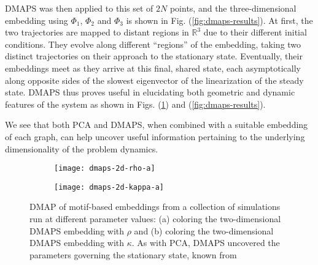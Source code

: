   DMAPS was then applied to this set of $2N$ points, and the
  three-dimensional embedding using $\Phi_1$, $\Phi_2$ and $\Phi_3$ is
  shown in Fig. (\ref{fig:dmaps-results}).
  At first, the two trajectories are mapped to distant regions in
  $\mathbb{R}^3$ due to their different initial conditions.
  They evolve along different ``regions'' of the embedding, taking two
  distinct trajectories on their approach to the stationary state.
  Eventually, their embeddings meet as they arrive at this final,
  shared state, each asymptotically along opposite sides of the
  slowest eigenvector of the linearization of the steady state.
  DMAPS thus proves useful in elucidating both geometric and dynamic
  features of the system as shown in Figs. (\ref{fig:dmaps-rk}) and (\ref{fig:dmaps-results}).

  We see that both PCA and DMAPS, when combined with a suitable
  embedding of each graph, can help uncover useful information
  pertaining to the underlying dimensionality of the problem dynamics.


  \begin{figure}
    \vspace{-5mm} \centering
    \begin{subfigure}{0.49\textwidth}
      \centering
      \texttt{[image: dmaps-2d-rho-a]}
      \subcaption{\label{fig:dmaps-rho}}
    \end{subfigure} %
    \begin{subfigure}{0.49\textwidth}
      \centering
      \texttt{[image: dmaps-2d-kappa-a]}
      \subcaption{\label{fig:dmaps-kappa}}
    \end{subfigure}%
    \caption[DMAP of motif-based embeddings when system parameters are
    varied]{DMAP of motif-based embeddings from a collection of
      simulations run at different parameter values: (a) coloring the
      two-dimensional DMAPS embedding with $\rho$ and (b) coloring the
      two-dimensional DMAPS embedding with $\kappa$. As with PCA,
      DMAPS uncovered the parameters governing the stationary state,
      known from \cite{rath_time_2012} \label{fig:dmaps-rk}}
  \end{figure}

